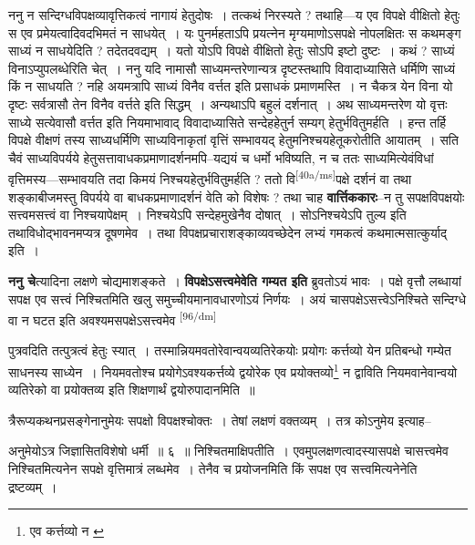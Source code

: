 \documentclass[article,12pt,a4paper]{memoir}
\begin{document}
	  \pstart ननु न सन्दिग्धविपक्षव्यावृत्तिकत्वं नागायं हेतुदोषः । तत्कथं निरस्यते ? तथाहि—य एव विपक्षे वीक्षितो हेतुः स एव प्रमेयत्वादिवदभिमतं न साधयेत् । यः पुनर्महताऽपि प्रयत्नेन मृग्यमाणोऽसपक्षे नोपलक्षितः स कथमङ्ग साध्यं न साधयेदिति ? तदेतदवद्यम् । यतो योऽपि विपक्षे वीक्षितो हेतुः सोऽपि इष्टो दुष्टः । कथं ? साध्यं विनाऽप्युपलब्धेरिति चेत् । ननु यदि नामासौ साध्यमन्तरेणान्यत्र दृष्टस्तथापि विवादाध्यासिते धर्मिणि साध्यं किं न साधयति ? नहि अयमत्रापि साध्यं विनैव वर्त्तत इति प्रसाधकं प्रमाणमस्ति । न चैकत्र येन विना यो दृष्टः सर्वत्रासौ तेन विनैव वर्त्तते इति सिद्धम् । अन्यथाऽपि बहुलं दर्शनात् । अथ साध्यमन्तरेण यो वृत्तः साध्ये सत्येवासौ वर्त्तत इति नियमाभावाद् विवादाध्यासिते सन्देहहेतुर्न सम्यग् हेतुर्भवितुमर्हति । हन्त तर्हि विपक्षे वीक्षणं तस्य साध्यधर्मिणि साध्यविनाकृतां वृत्तिं सम्भावयद् हेतुमनिश्चयहेतूकरोतीति आयातम् । सति चैवं साध्यविपर्यये हेतुसत्तावाधकप्रमाणादर्शनमपि--यद्ययं च धर्मो भविष्यति, न च ततः साध्यमित्येवंविधां वृत्तिमस्य—सम्भावयति तदा किमयं निश्चयहेतुर्भवितुमर्हति ? ततो वि\leavevmode\textsuperscript{\rmlatinfont\tiny [40a/ms]}पक्षे दर्शनं वा तथा शङ्काबीजमस्तु विपर्यये वा बाधकप्रमाणादर्शनं वेति को विशेषः ? तथा चाह \textbf{वार्त्तिककारः}--न तु सपक्षविपक्षयोः सत्त्वमसत्त्वं वा निश्चयापेक्षम् । निश्चयेऽपि सन्देहमुखेनैव दोषात् । सोऽनिश्चयेऽपि तुल्य इति तथाविधोद्भावनमप्यत्र दूषणमेव । तथा विपक्षप्रचाराशङ्काव्यवच्छेदेन लभ्यं गमकत्वं कथमात्मसात्कुर्याद् इति ।
	\pend
      

	  \pstart \textbf{ननु चे}त्यादिना लक्षणे चोद्यमाशङ्कते । \textbf{विपक्षेऽसत्त्वमेवेति गम्यत इति} ब्रुवतोऽयं भावः । पक्षे वृत्तौ लब्धायां सपक्ष एव सत्त्वं निश्चितमिति खलु समुच्चीयमानावधारणोऽयं निर्णयः । अयं चासपक्षेऽसत्त्वेऽनिश्चिते सन्दिग्धे वा न घटत इति अवश्यमसपक्षेऽसत्त्वमेव    \leavevmode\textsuperscript{\rmlatinfont\tiny [96/dm]} 
	  
	पुत्रवदिति तत्पुत्रत्वं हेतुः स्यात् । तस्मान्नियमवतोरेवान्वयव्यतिरेकयोः प्रयोगः कर्त्तव्यो येन प्रतिबन्धो गम्येत साधनस्य साध्येन । नियमवतोश्च प्रयोगेऽवश्यकर्त्तव्ये द्वयोरेक एव प्रयोक्तव्यो\footnote{एव कर्त्तव्यो न \cite{dp-msA}} न द्वाविति नियमवानेवान्वयो व्यतिरेको वा प्रयोक्तव्य इति शिक्षणार्थं द्वयोरुपादानमिति ॥ 
	  
	त्रैरूप्यकथनप्रसङ्गेनानुमेयः सपक्षो विपक्षश्चोक्तः । तेषां लक्षणं वक्तव्यम् । तत्र कोऽनुमेय इत्याह-- 
	  
	अनुमेयोऽत्र जिज्ञासितविशेषो धर्मी ॥ ६ ॥ निश्चितमाक्षिपतीति । एवमुपलक्षणत्वादस्यासपक्षे चासत्त्वमेव निश्चितमित्यनेन सपक्षे वृत्तिमात्रं लब्धमेव । तेनैव च प्रयोजनमिति किं सपक्ष एव सत्त्वमित्यनेनेति द्रष्टव्यम् ।
	\pend
      
\end{document}

